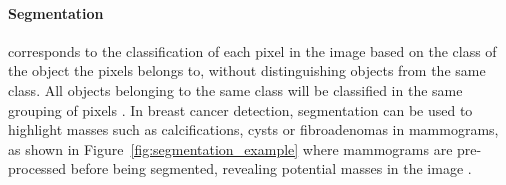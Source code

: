 \paragraph{Segmentation} corresponds to the classification of each pixel in the image based on the class of the object the pixels belongs to, without distinguishing objects from the same class. All objects belonging to the same class will be classified in the same grouping of pixels \citep{Geron2019}. In breast cancer detection, segmentation can be used to highlight masses such as calcifications, cysts or fibroadenomas \citep{breastcancerorg2018} in mammograms, as shown in Figure~\ref{fig:segmentation_example} where mammograms are pre-processed before being segmented, revealing potential masses in the image \citep{Pereira2014}.\\

